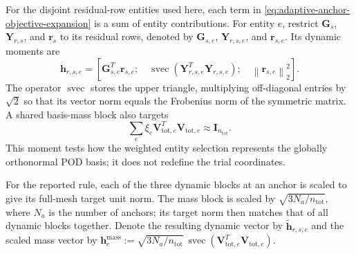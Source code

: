 \documentclass[11pt]{article}
\newcommand{\norm}[1]{\left\lVert #1 \right\rVert}
\begin{document}
For the disjoint residual-row entities used here, each term in
\eqref{eq:adaptive-anchor-objective-expansion} is a sum of entity
contributions.  For entity $e$, restrict $\mathbf G_s$,
$\mathbf Y_{r,s}$, and $\mathbf r_s$ to its residual rows, denoted by
$\mathbf G_{s,e}$, $\mathbf Y_{r,s,e}$, and $\mathbf r_{s,e}$.  Its
dynamic moments are
\begin{equation}
\mathbf h_{r,s,e}=\left[
\mathbf G_{s,e}^T\mathbf r_{s,e};\quad
\operatorname{svec}(\mathbf Y_{r,s,e}^T\mathbf Y_{r,s,e});\quad
\norm{\mathbf r_{s,e}}_2^2\right].
\label{eq:adaptive-cell-moments}
\end{equation}
The operator $\operatorname{svec}$ stores the upper triangle, multiplying
off-diagonal entries by $\sqrt{2}$ so that its vector norm equals the
Frobenius norm of the symmetric matrix.  A shared basis-mass block also
targets
\begin{equation}
\sum_e\xi_e\mathbf V_{\mathrm{tot},e}^T
\mathbf V_{\mathrm{tot},e}\approx\mathbf I_{n_{\mathrm{tot}}}.
\label{eq:adaptive-mass-moment}
\end{equation}
This moment tests how the weighted entity selection represents the
globally orthonormal POD basis; it does not redefine the trial coordinates.

For the reported rule, each of the three dynamic blocks at an anchor is
scaled to give its full-mesh target unit norm.  The mass block is scaled
by $\sqrt{3N_a/n_{\mathrm{tot}}}$, where $N_a$ is the number of anchors;
its target norm then matches that of all dynamic blocks together.  Denote
the resulting dynamic vector by $\widetilde{\mathbf h}_{r,s,e}$ and the
scaled mass vector by
$\mathbf h_e^{\mathrm{mass}}:=\sqrt{3N_a/n_{\mathrm{tot}}}\,
\operatorname{svec}(\mathbf V_{\mathrm{tot},e}^T
\mathbf V_{\mathrm{tot},e})$.
\end{document}
